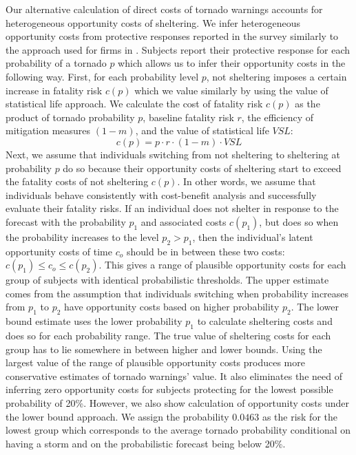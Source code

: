 \documentclass{ametsocV6.1}
\begin{document}
Our alternative calculation of direct costs of tornado warnings accounts for heterogeneous opportunity costs of sheltering. We infer heterogeneous opportunity costs from protective responses reported in the survey similarly to the approach used for firms in \citet{howard_firm_2021}. Subjects report their protective response for each probability of a tornado $p$ which allows us to infer their opportunity costs in the following way. First, for each probability level $p$, not sheltering imposes a certain increase in fatality risk $c(p)$ which we value similarly by using the value of statistical life approach. We calculate the cost of fatality risk $c(p)$ as the product of tornado probability $p$, baseline fatality risk $r$, the efficiency of mitigation measures $(1-m)$, and the value of statistical life $VSL$:
$$c(p)=p \cdot r \cdot (1-m) \cdot VSL$$
Next, we assume that individuals switching from not sheltering to sheltering at probability $p$ do so because their opportunity costs of sheltering start to exceed the fatality costs of not sheltering $c(p)$. In other words, we assume that individuals behave consistently with cost-benefit analysis and successfully evaluate their fatality risks.  If an individual does not shelter in response to the forecast with the probability $p_1$ and associated costs $c(p_1)$, but does so when the probability increases to the level $p_2>p_1$, then the individual's latent opportunity costs of time $c_o$ should be in between these two costs:  $c(p_1)\leq c_o\leq c(p_2)$. This gives a range of plausible opportunity costs for each group of subjects with identical probabilistic thresholds. The upper estimate comes from the assumption that individuals switching when probability increases from $p_1$ to $p_2$ have opportunity costs based on higher probability $p_2$. The lower bound estimate uses the lower probability $p_1$ to calculate sheltering costs and does so for each probability range.  The true value of sheltering costs for each group has to lie somewhere in between higher and lower bounds. Using the largest value of the range of plausible opportunity costs produces more conservative estimates of tornado warnings' value. It also eliminates the need of inferring zero opportunity costs for subjects protecting for the lowest possible probability of 20\%. However, we also show calculation of opportunity costs  under the lower bound approach. We assign the probability $0.0463$ as the risk for the lowest group which corresponds to the average tornado probability conditional on having a storm and on the probabilistic forecast being below 20\%.
\end{document}
